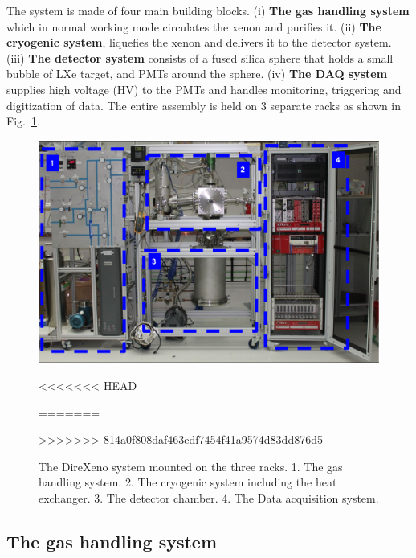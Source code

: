The system is made of four main building blocks. (i) \textbf{The gas handling system} which in normal working mode circulates the xenon and purifies it. (ii) \textbf{The cryogenic system}, liquefies the xenon and 
delivers it to the detector system. (iii) \textbf{The detector system} consists of a fused silica sphere that 
holds a small bubble of LXe target, and PMTs around the sphere. (iv) \textbf{The DAQ system} supplies high voltage (HV) 
to the PMTs and handles monitoring, triggering and digitization of data. The entire assembly is held on 3 separate racks as shown in Fig.~\ref{fig:fulldet}.



\begin{figure}[h]
\centerline{\includegraphics[width=0.8\linewidth]{FullSys.png}}
<<<<<<< HEAD
\caption{DIREXENO. 1. The gas handling system. 2. The cryogenic system including the heat exchanger. 3. The detector chamber. 4. The DAQ system.}
=======
\caption{The DireXeno system mounted on the three racks. 1. The gas handling system. 2. The cryogenic system including the heat exchanger. 3. The detector chamber. 4. The Data acquisition system.}
>>>>>>> 814a0f808daf463edf7454f41a9574d83dd876d5
\label{fig:fulldet}
\end{figure}



\subsection{The gas handling system}
\label{subsec:gas}

